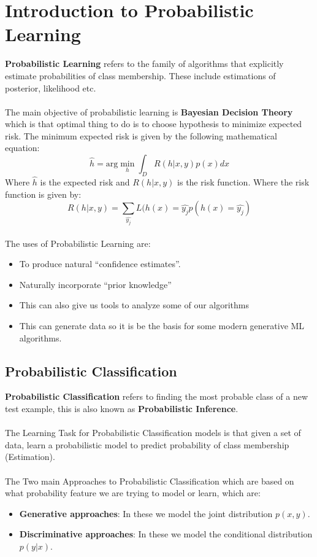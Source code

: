 \documentclass[12pt, a4paper]{book}
\begin{document}
\section{Introduction to Probabilistic Learning}
\textbf{Probabilistic Learning} refers to the family of algorithms that explicitly estimate probabilities of class membership. These include estimations of posterior, likelihood etc.\\\\
The main objective of probabilistic learning is \textbf{Bayesian Decision Theory} which is that optimal thing to do is to choose hypothesis to minimize expected risk. The minimum expected risk is given by the following mathematical equation:
$$\hat{h} = \text{arg}\min_h\int_DR(h|x,y)p(x) dx$$
Where $\hat{h}$ is the expected risk and $R(h|x,y)$ is the risk function. Where the risk function is given by:
$$R(h|x,y) = \sum_{\hat{y_j}}L(h(x) = \hat{y_j}p(h(x) = \hat{y_j})$$\\
The uses of Probabilistic Learning are:
\begin{itemize}
    \item To produce natural “confidence estimates”.
    \item Naturally incorporate “prior knowledge”
    \item This can also give us tools to analyze some of our
algorithms
    \item This can generate data so it is be the basis for some modern generative ML algorithms.
\end{itemize}

\subsection{Probabilistic Classification}
\textbf{Probabilistic Classification} refers to finding the most probable class of a new test example, this is also known as \textbf{Probabilistic Inference}.\\\\
The Learning Task for Probabilistic Classification models is that given a set of data, learn a probabilistic model to predict probability of class membership (Estimation).\\\\
The Two main Approaches to Probabilistic Classification which are based on what probability feature we are trying to model or learn, which are:
\begin{itemize}
    \item \textbf{Generative approaches}: In these we model the joint distribution $p(x,y)$.
    \item \textbf{Discriminative approaches}: In these we model the conditional distribution $p(y|x)$.\\
\end{itemize}
\end{document}

